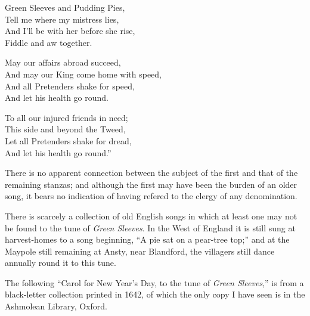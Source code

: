 \begin{dcverse}\settowidth{\versewidth}{And I’ll be with her before she rise,}
\begin{patverse}
Green Sleeves and Pudding Pies,\\
Tell me where my mistress lies,\\
And I’ll be with her before she rise,\\
Fiddle and aw together.
\end{patverse}

\settowidth{\versewidth}{And may our King come home with speed,}
\begin{patverse}
May our affairs abroad succeed,\\
And may our King come home with speed,\\
And all Pretenders shake for speed,\\
And let his health go round.
\end{patverse}
\end{dcverse}
\settowidth{\versewidth}{Let all Pretenders shake for dread,}
\begin{scverse}To all our injured friends in need;\\
This side and beyond the Tweed,\\
Let all Pretenders shake for dread,\\
\vin And let his health go round.”
\end{scverse}

There is no apparent connection between the subject of the first and that of the
remaining stanzas; and although the first may have been the burden of an older
song, it bears no indication of having refered to the clergy of any denomination.

There is scarcely a collection of old English songs in which at least one may
not be found to the tune of \textit{Green Sleeves}. In the West of England it is still
sung at harvest-homes to a song beginning, “A pie sat on a pear-tree top;” and
at the Maypole still remaining at Ansty, near Blandford, the villagers still dance
annually round it to this tune.

The following “Carol for New Year’s Day, to the tune of \textit{Green Sleeves},” is
from a black-letter collection printed in 1642, of which the only copy I have seen
is in the Ashmolean Library, Oxford.

